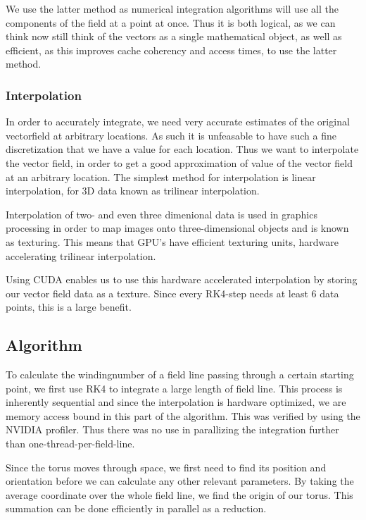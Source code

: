\documentclass{article}
\begin{document}
We use the latter method as numerical integration algorithms will use all the components of the field at a point at once. %
Thus it is both logical, as we can think now still think of the vectors as a single mathematical object, as well as efficient, as this improves cache coherency and access times, to use the latter method.

\subsubsection{Interpolation}
In order to accurately integrate, we need very accurate estimates of the original vectorfield at arbitrary locations. As such it is unfeasable to have such a fine discretization that we have a value for each location. 
Thus we want to interpolate the vector field, in order to get a good approximation of value of the vector field at an arbitrary location. The simplest method for interpolation is linear interpolation, for 3D data known as trilinear interpolation.

Interpolation of two- and even three dimenional data is used in graphics processing in order to map images onto three-dimensional objects and is known as texturing. This means that GPU's have efficient texturing units, hardware accelerating trilinear interpolation. 

Using CUDA enables us to use this hardware accelerated interpolation by storing our vector field data as a texture. Since every RK4-step needs at least 6 data points, this is a large benefit. %
\subsection{Algorithm}
To calculate the windingnumber of a field line passing through a certain starting point, we first use RK4 to integrate a large length of field line. This process is inherently sequential and since the interpolation is hardware optimized, we are memory access bound in this part of the algorithm. This was verified by using the NVIDIA profiler. Thus there was no use in parallizing the integration further than one-thread-per-field-line.

Since the torus moves through space, we first need to find its position and orientation before we can calculate any other relevant parameters.
By taking the average coordinate over the whole field line, we find the origin of our torus. This summation can be done efficiently in parallel as a reduction.
\end{document}
